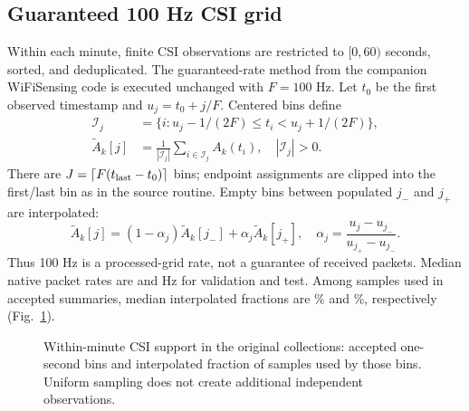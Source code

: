 \documentclass[conference,10pt,letterpaper]{IEEEtran}
\begin{document}
\subsection{Guaranteed 100 Hz CSI grid}
Within each minute, finite CSI observations are restricted to $[0,60)$ seconds, sorted, and deduplicated. The guaranteed-rate method from the companion WiFiSensing code is executed unchanged with $F=100$ Hz. Let $t_0$ be the first observed timestamp and $u_j=t_0+j/F$. Centered bins define
\begin{align}
\mathcal I_j&=\{i:u_j-1/(2F)\leq t_i<u_j+1/(2F)\},\\
\widetilde A_k[j]&=\frac{1}{|\mathcal I_j|}\sum_{i\in\mathcal I_j}A_k(t_i),
\quad |\mathcal I_j|>0.\label{eq:resample}
\end{align}
There are $J=\lceil F(t_{\rm last}-t_0)\rceil$ bins; endpoint assignments are clipped into the first/last bin as in the source routine. Empty bins between populated $j_-$ and $j_+$ are interpolated:
\begin{equation}
\widetilde A_k[j]=(1-\alpha_j)\widetilde A_k[j_-]+\alpha_j\widetilde A_k[j_+],\quad
\alpha_j=\frac{u_j-u_{j_-}}{u_{j_+}-u_{j_-}}.\label{eq:interpolation}
\end{equation}
Thus 100 Hz is a processed-grid rate, not a guarantee of received packets. Median native packet rates are \ValPacketRate{} and \TestPacketRate{} Hz for validation and test. Among samples used in accepted summaries, median interpolated fractions are \ValInterpolation\% and \TestInterpolation\%, respectively (Fig.~\ref{fig:temporal}).

\begin{figure}[t]
\centering
\caption{Within-minute CSI support in the original collections: accepted one-second bins and interpolated fraction of samples used by those bins. Uniform sampling does not create additional independent observations.}
\label{fig:temporal}
\end{figure}
\end{document}
